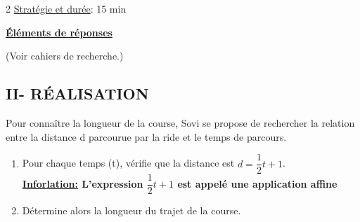 \begin{multicols*}{2}
 	\underline{Stratégie et durée}: 15 min
 	\begin{center}
 		\underline{\textbf{Éléments de réponses}}
 	\end{center}
 	(Voir cahiers de recherche.)
 
 	\begin{center}
 		\section*{II- RÉALISATION}
 	\end{center}
 	
 	Pour connaître la longueur de la course, Sovi se propose de rechercher la relation entre la distance d parcourue par la
 	ride et le temps de parcours.\\
 	\begin{enumerate}
 		\item Pour chaque temps (t), vérifie que la distance est $ d=\dfrac{1}{2}t+1 $.
 		\\ \textbf{\underline{Inforlation:} L'expression $ \dfrac{1}{2}t+1 $ est appelé une application affine}
 		\item Détermine alors la longueur du trajet de la
 		course.
 	\end{enumerate}
 	\dures
 	 
 	

\end{multicols*}
